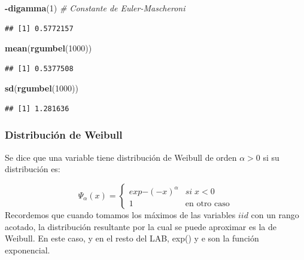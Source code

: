 \documentclass[
]{book}
\newenvironment{Shaded}{\begin{snugshade}}{\end{snugshade}}
\newcommand{\CommentTok}[1]{\textcolor[rgb]{0.56,0.35,0.01}{\textit{#1}}}
\newcommand{\DecValTok}[1]{\textcolor[rgb]{0.00,0.00,0.81}{#1}}
\newcommand{\FunctionTok}[1]{\textcolor[rgb]{0.13,0.29,0.53}{\textbf{#1}}}
\newcommand{\NormalTok}[1]{#1}
\newcommand{\SpecialCharTok}[1]{\textcolor[rgb]{0.81,0.36,0.00}{\textbf{#1}}}
\theoremstyle{definition}
\theoremstyle{definition}
\theoremstyle{definition}
\theoremstyle{definition}
\theoremstyle{remark}
\begin{document}
\begin{Shaded}
\begin{Highlighting}[]
\SpecialCharTok{{-}}\FunctionTok{digamma}\NormalTok{(}\DecValTok{1}\NormalTok{) }\CommentTok{\# Constante de Euler{-}Mascheroni}
\end{Highlighting}
\end{Shaded}

\begin{verbatim}
## [1] 0.5772157
\end{verbatim}

\begin{Shaded}
\begin{Highlighting}[]
\FunctionTok{mean}\NormalTok{(}\FunctionTok{rgumbel}\NormalTok{(}\DecValTok{1000}\NormalTok{))}
\end{Highlighting}
\end{Shaded}

\begin{verbatim}
## [1] 0.5377508
\end{verbatim}

\begin{Shaded}
\begin{Highlighting}[]
\FunctionTok{sd}\NormalTok{(}\FunctionTok{rgumbel}\NormalTok{(}\DecValTok{1000}\NormalTok{))}
\end{Highlighting}
\end{Shaded}

\begin{verbatim}
## [1] 1.281636
\end{verbatim}

\subsubsection{Distribución de Weibull}\label{distribuciuxf3n-de-weibull}

Se dice que una variable tiene distribución de
Weibull de orden \(\alpha>0\) si su distribución es:

\[\Psi_{\alpha}(x)=\begin{cases}
exp{-(-x)^{\alpha}} & si\;x<0\\
1 & \text{en otro caso}
\end{cases}\]
Recordemos que cuando tomamos los máximos de las variables \(iid\) con un rango acotado, la distribución resultante por la cual se puede aproximar es la de Weibull. En este caso, y en el resto del LAB, exp() y e son la función exponencial.
\end{document}
